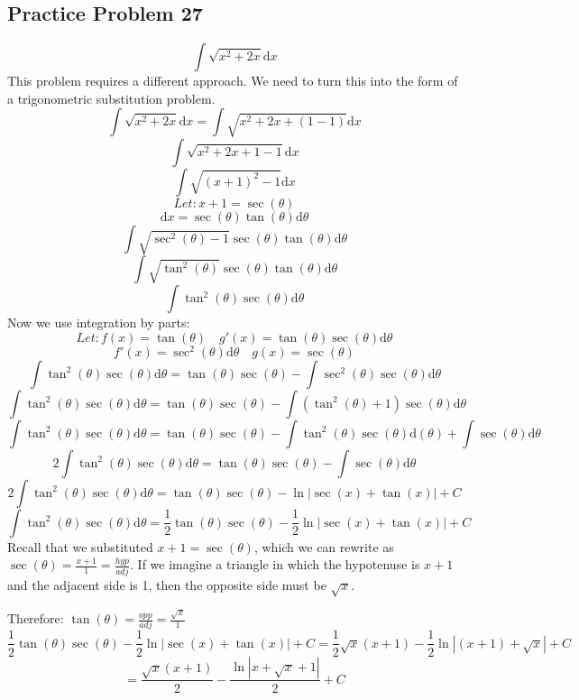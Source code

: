 \documentclass[letterpaper, 12pt]{article}
\newcommand*{\diff}{\mathrm{d}}
\begin{document}
\subsection*{Practice Problem 27}
\[ \int{\sqrt{x^{2}+2x}\diff{x}} \]
This problem requires a different approach. We need to turn this into the form
of a trigonometric substitution problem.
\[ \int{\sqrt{x^{2}+2x}\diff{x}} = \int{\sqrt{x^{2}+2x+(1-1)}\diff{x}} \]
\[ \int{\sqrt{x^{2}+2x+1-1}\diff{x}} \]
\[ \int{\sqrt{(x+1)^{2}-1}\diff{x}} \]
\[ Let: x+1 = \sec(\theta) \]
\[ \diff{x} = \sec(\theta)\tan(\theta)\diff{\theta} \]
\[ \int{\sqrt{\sec^{2}(\theta)-1}\sec(\theta)\tan(\theta)\diff{\theta}} \]
\[ \int{\sqrt{\tan^{2}(\theta)}\sec(\theta)\tan(\theta)\diff{\theta}} \]
\[ \int{\tan^{2}(\theta)\sec(\theta)\diff{\theta}} \]
Now we use integration by parts:
\[ Let: f(x) = \tan(\theta) \quad
   g'(x) = \tan(\theta)\sec(\theta)\diff{\theta} \]
\[ f'(x) = \sec^{2}(\theta)\diff{\theta} \quad g(x) = \sec(\theta) \]
\[ \int{\tan^{2}(\theta)\sec(\theta)\diff{\theta}} =
   \tan(\theta)\sec(\theta)-\int{\sec^{2}(\theta)\sec(\theta)\diff{\theta}} \]
\[ \int{\tan^{2}(\theta)\sec(\theta)\diff{\theta}} =
   \tan(\theta)\sec(\theta)-
   \int{(\tan^{2}(\theta)+1)\sec(\theta)\diff{\theta}} \]
\[ \int{\tan^{2}(\theta)\sec(\theta)\diff{\theta}} =
   \tan(\theta)\sec(\theta)-\int{\tan^{2}(\theta)\sec(\theta)\diff(\theta)}+
   \int{\sec(\theta)\diff{\theta}} \]
\[ 2\int{\tan^{2}(\theta)\sec(\theta)\diff{\theta}} =
   \tan(\theta)\sec(\theta)-\int{\sec(\theta)\diff{\theta}} \]
\[ 2\int{\tan^{2}(\theta)\sec(\theta)\diff{\theta}} =
   \tan(\theta)\sec(\theta)-\ln|\sec(x)+\tan(x)|+C \]
\[ \int{\tan^{2}(\theta)\sec(\theta)\diff{\theta}} =
   \frac{1}{2}\tan(\theta)\sec(\theta)-\frac{1}{2}\ln|\sec(x)+\tan(x)|+C \]
Recall that we substituted \( x+1 = \sec(\theta) \), which we can rewrite as
\( \sec(\theta) = \frac{x+1}{1} = \frac{hyp}{adj} \). If we imagine a triangle
in which the hypotenuse is \( x+1 \) and the adjacent side is 1, then the
opposite side must be \( \sqrt{x} \).
\begin{center}
\end{center}
Therefore: \( \tan(\theta) = \frac{opp}{adj} = \frac{\sqrt{x}}{1} \)
\[ \frac{1}{2}\tan(\theta)\sec(\theta)-\frac{1}{2}\ln|\sec(x)+\tan(x)|+C =
   \frac{1}{2}\sqrt{x}(x+1)-\frac{1}{2}\ln|(x+1)+\sqrt{x}|+C \]
\[ = \frac{\sqrt{x}(x+1)}{2}-\frac{\ln|x+\sqrt{x}+1|}{2}+C \]
\end{document}
